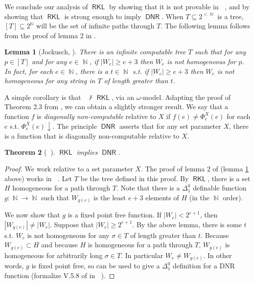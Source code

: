 \documentclass{amsart}
\theoremstyle{plain}
\newtheorem{theorem}{Theorem}
\newtheorem{lemma}[theorem]{Lemma}
\theoremstyle{remark}
\theoremstyle{definition}
\DeclareMathOperator{\RCA}{\mathsf{RCA}_0}
\DeclareMathOperator{\DNR}{\mathsf{DNR}}
\DeclareMathOperator{\RKL}{\mathsf{RKL}}
\DeclareMathOperator{\N}{\mathbb{N}}
\begin{document}
We conclude our analysis of $\RKL$ by showing that it is not provable in $\RCA$, 
and by showing that $\RKL$ is strong enough to imply $\DNR$.
%  
When $T\subseteq 2^{<\N}$ is a tree, $[T]\subseteq 2^{\N}$ will be the set of infinite paths through $T$.
The following lemma follows from the proof of lemma 2 in \cite{pi-bi-immune}.
				
\begin{lemma}[Jockusch, \cite{pi-bi-immune}]
\label{lemma.immune-tree}
There is an infinite computable tree $T$ such that for any $p\in [T]$ and for any $e\in\N$, 
if $|W_e|\geq e+3$ then $W_e$ is not homogeneous for $p$.
	In fact, for each $e\in\N$, there is a $t\in\N$ s.t. if $|W_e|\geq e+3$ then $W_e$ is not homogeneous for any string in $T$ of length greater than $t$.
\end{lemma}

A simple corollary is that $\RCA\not\vdash \RKL$, via an $\omega$-model.  
Adapting the proof of Theorem 2.3 from \cite{combprinciples2}, we can obtain a slightly stronger result.
%
We say that a function $f$ is \emph{diagonally non-computable} relative to $X$ if $f(e)\neq\Phi^X_e(e)$ for each $e$ s.t. $\Phi^X_e(e)\downarrow$.
The principle $\DNR$ asserts that for any set parameter $X$, there is a function that is diagonally non-computable relative to $X$. 

\begin{theorem}[$\RCA$]
$\RKL$ implies $\DNR$.
\end{theorem}
\begin{proof}
We work relative to a set parameter $X$. The proof of lemma 2 of \cite{pi-bi-immune} (lemma \ref{lemma.immune-tree} above) works in $\RCA$.
Let $T$ be the tree defined in this proof.  
By $\RKL$, there is a set $H$ homogeneous for a path through $T$.  
Note that there is a $\Delta^0_1$ definable function $g:\N\rightarrow\N$ such that $W_{g(e)}$ is the least $e+3$ elements of $H$ (in the $\N$ order).  \par
	We now show that $g$ is a fixed point free function.  If $|W_e|<2^{e+1}$, then $|W_{g(e)}|\neq|W_e|$.  
	Suppose that $|W_e| \geq 2^{e+1}$.  
	By the above lemma, there is some $t$ s.t. $W_e$ is not homogeneous for any $\sigma\in T$ of length greater than $t$.  
	Because $W_{g(e)}\subset H$ and because $H$ is homogeneous for a path through $T$, $W_{g(e)}$ is homogeneous for arbitrarily long $\sigma\in T$.  In particular $W_e\neq W_{g(e)}$.  
	In other words, $g$ is fixed point free, so can be used to give a $\Delta^0_1$ definition for a DNR function (formalize V.5.8 of \cite{soare} in $\RCA$).
\end{proof}
\end{document}
